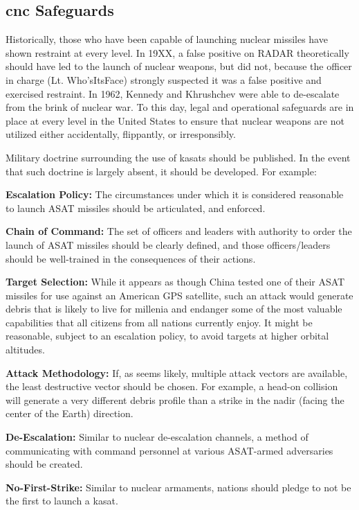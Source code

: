 \subsection{\acf{cnc} Safeguards}
Historically, those who have been capable of launching nuclear
missiles have shown restraint at every level.  In 19XX, a false
positive on RADAR theoretically should have led to the launch of
nuclear weapons, but did not, because the officer in charge
(Lt. Who'sItsFace) strongly suspected it was a false positive and
exercised restraint.\cite{xxx} In 1962, Kennedy and Khrushchev were
able to de-escalate from the brink of nuclear war.  To this day, legal
and operational safeguards are in place at every level in the United
States to ensure that nuclear weapons are not utilized either
accidentally, flippantly, or irresponsibly.

Military doctrine surrounding the use of \acp{kasat} should be
published.  In the event that such doctrine is largely absent, it
should be developed.  For example:

\textbf{Escalation Policy:} The circumstances under which it is
considered reasonable to launch ASAT missiles should be articulated,
and enforced.

\textbf{Chain of Command:} The set of officers and leaders with
authority to order the launch of ASAT missiles should be clearly
defined, and those officers/leaders should be well-trained in the
consequences of their actions.

\textbf{Target Selection:} While it appears as though China tested one
of their ASAT missiles for use against an American GPS satellite, such
an attack would generate debris that is likely to live for millenia
and endanger some of the most valuable capabilities that all citizens
from all nations currently enjoy.  It might be reasonable, subject to
an escalation policy, to avoid targets at higher orbital altitudes.

\textbf{Attack Methodology:} If, as seems likely, multiple attack
vectors are available, the least destructive vector should be chosen.
For example, a head-on collision will generate a very different debris
profile than a strike in the nadir (facing the center of the Earth)
direction.

\textbf{De-Escalation:} Similar to nuclear de-escalation channels, a
method of communicating with command personnel at various ASAT-armed
adversaries should be created.

\textbf{No-First-Strike:} Similar to nuclear armaments, nations should
pledge to not be the first to launch a \ac{kasat}.

